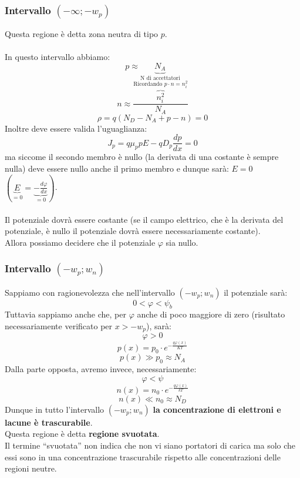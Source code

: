 \documentclass{article}
\numberwithin{equation}{subsection}
\begin{document}
	\subsubsection{Intervallo $(-\infty; -w_p)$}
	\label{subsub:int-pn1}
	Questa regione è detta zona neutra di tipo $p$.\\\\
	In questo intervallo abbiamo:
	$$p \approx \underbrace{N_A}_{\text{N di accettatori}}$$
	$$n \approx \frac{\overbrace{n_i^2}^{\text{Ricordando }p\cdot n = n_i^2}}{N_A}$$
	$$\rho = q(N_D - N_A + p - n) = 0$$
	Inoltre deve essere valida l’uguaglianza:
	$$J_p = q\mu_p p E - qD_p \frac{dp}{dx} = 0$$
	ma siccome il secondo membro è nullo (la derivata di una costante è sempre nulla) deve essere nullo anche il primo membro e dunque sarà: $E = 0$ $(\underbrace{E}_{=0} = \underbrace{- \frac{d \varphi}{dx}}_{=0})$.\\\\
	Il potenziale dovrà essere costante (se il campo elettrico, che è la derivata del potenziale, è nullo il potenziale dovrà essere necessariamente costante). \\
	Allora possiamo decidere che il potenziale $\varphi$ sia nullo.
	\subsubsection{Intervallo $(-w_p; w_n)$}
	\label{subsub:int-pn2}
	Sappiamo con ragionevolezza che nell’intervallo $(-w_p; w_n)$ il potenziale sarà:
	$$0 < \varphi < \psi_b$$
	Tuttavia sappiamo anche che, per $\varphi$ anche di poco maggiore di zero (risultato necessariamente verificato per $x > -w_p$), sarà:
	$$\varphi > 0$$
	$$p(x) = p_0 \cdot e^{-\frac{q\varphi(x)}{KT}}$$
	$$p(x) \gg p_0 \approx N_A$$
	Dalla parte opposta, avremo invece, necessariamente:
	$$\varphi < \psi$$
	$$n(x) = n_0 \cdot e^{-\frac{q\varphi(x)}{kT}}$$
	$$n(x) \ll n_0 \approx N_D$$
	Dunque in tutto l’intervallo $(-w_p; w_n)$ \textbf{la concentrazione di elettroni e lacune è trascurabile}. \\
	Questa regione è detta \textbf{regione svuotata}. \\
	Il termine “svuotata” non indica che non vi siano portatori di carica ma solo che essi sono in una concentrazione trascurabile rispetto alle concentrazioni delle regioni neutre.
\end{document}
